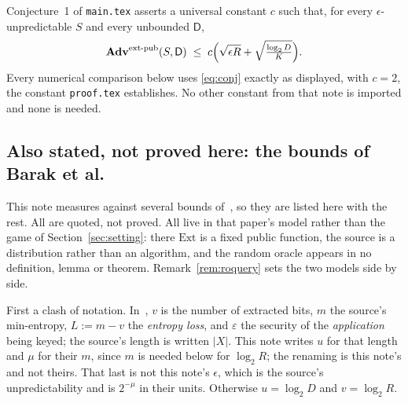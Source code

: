 \documentclass{aicr-solution}
\newcommand{\Adv}{\mathbf{Adv}}
\newcommand{\extpub}{\textup{ext-pub}}
\begin{document}
Conjecture~1 of
\texttt{main.tex} asserts a universal constant $c$ such that, for every $\epsilon$-unpredictable $S$
and every unbounded $\mathsf{D}$,
\begin{equation}\label{eq:conj}
  \Adv^{\extpub}(S,\mathsf{D}) \;\le\; c\Bigl(\sqrt{\epsilon R} + \sqrt{\tfrac{\log_2 D}{K}}\Bigr) .
\end{equation}
Every numerical comparison below uses \eqref{eq:conj} exactly as displayed, with $c = 2$, the
constant \texttt{proof.tex} establishes. No other constant from that note is imported and none is
needed.

\subsection*{Also stated, not proved here: the bounds of Barak et al.}

This note measures against several bounds of~\cite{BDKPPSY11}, so they are listed here with the
rest. All are quoted, not proved. All live in that paper's model rather than the game of
Section~\ref{sec:setting}: there $\mathrm{Ext}$ is a fixed public function, the source is a
distribution rather than an algorithm, and the random oracle appears in no definition, lemma or
theorem. Remark~\ref{rem:roquery} sets the two models side by side.

First a clash of notation. In~\cite{BDKPPSY11}, $v$ is the number of extracted bits, $m$ the
source's min-entropy, $L := m - v$ the \emph{entropy loss}, and $\varepsilon$ the security of the
\emph{application} being keyed; the source's length is written $|X|$. This note writes $u$ for
that length and $\mu$ for their $m$, since $m$ is needed below for $\log_2 R$; the renaming is
this note's and not theirs. That last is not this note's
$\epsilon$, which is the source's unpredictability and is $2^{-\mu}$ in their units. Otherwise
$u = \log_2 D$ and $v = \log_2 R$.
\end{document}

